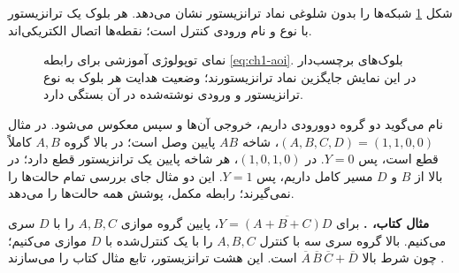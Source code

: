 شکل \ref{fig:ch1-aoi} شبکه‌ها را بدون شلوغی نماد ترانزیستور نشان می‌دهد.
هر بلوک یک ترانزیستور با نوع و نام ورودی کنترل است؛ نقطه‌ها اتصال الکتریکی‌اند.
\begin{figure}[ht]
\centering
\begin{latin}
\end{latin}
\caption{نمای توپولوژی آموزشی  برای رابطه \eqref{eq:ch1-aoi}.
بلوک‌های برچسب‌دار در این نمایش جایگزین نماد ترانزیستورند؛
وضعیت هدایت هر بلوک به نوع ترانزیستور و ورودی نوشته‌شده در آن بستگی دارد.}
\label{fig:ch1-aoi}
\end{figure}

نام  می‌گوید دو گروه  دوورودی داریم،
خروجی آن‌ها  و سپس معکوس می‌شود.
در مثال \((A,B,C,D)=(1,1,0,0)\)، شاخه \(AB\) پایین وصل است؛
در بالا گروه \(A,B\) کاملاً قطع است، پس \(Y=0\).
در \((1,0,1,0)\)، هر شاخه پایین یک ترانزیستور قطع دارد؛
در بالا از \(B\) و \(D\) مسیر کامل داریم، پس \(Y=1\).
این دو مثال جای بررسی تمام حالت‌ها را نمی‌گیرند؛ رابطه مکمل، پوشش همه حالت‌ها را می‌دهد.

\textbf{مثال کتاب، .} برای
\(Y=\overline{(A+B+C)D}\)، پایین گروه موازی \(A,B,C\) را با \(D\) سری می‌کنیم.
بالا گروه سری سه  با کنترل \(A,B,C\) را با یک  کنترل‌شده با \(D\)
موازی می‌کنیم؛ چون شرط بالا
\(\overline{A}\,\overline{B}\,\overline{C}+\overline{D}\) است.
این هشت ترانزیستور، تابع مثال  کتاب را می‌سازند
\cite[صفحه چاپی ۱۲]{weste}.

